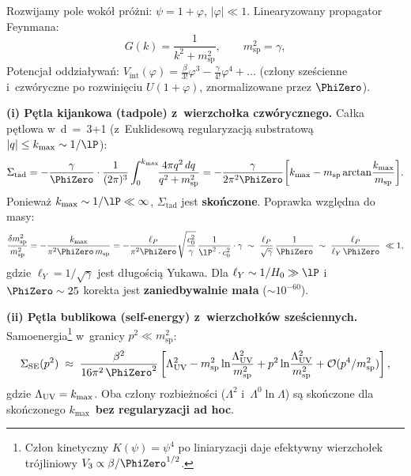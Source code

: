\begin{proposition}\label{prop:one-loop-UV}

Rozwijamy pole wok\'o\l{} pr\'o\.zni: $\psi = 1 + \varphi$,
$|\varphi| \ll 1$. Linearyzowany propagator Feynmana:
\begin{equation}\label{eq:prop-TGP-loops}
  G(k)
  = \frac{1}{k^2 + m_{\mathrm{sp}}^2},
  \qquad m_{\mathrm{sp}}^2 = \gamma,
\end{equation}
Potencja\l{} oddziaływa\'n:
$V_{\mathrm{int}}(\varphi) = \frac{\beta}{3!}\varphi^3
- \frac{\gamma}{4!}\varphi^4 + \ldots$ (cz\l{}ony sze\'scienne i~czw\'oryczne
po rozwini\k{e}ciu $U(1+\varphi)$, znormalizowane przez $\PhiZero$).

\medskip\noindent
\textbf{(i) P\k{e}tla kijankowa (tadpole) z~wierzcho\l{}ka czw\'orycznego.}
Ca\l{}ka p\k{e}tlowa w~d~=~3+1 (z~Euklidesow\k{a} regularyzacj\k{a}
substratow\k{a} $|q| \le k_{\max} \sim 1/\lP$):
\begin{equation}\label{eq:tadpole-TGP}
  \Sigma_{\mathrm{tad}}
  = -\frac{\gamma}{\PhiZero}\cdot
    \frac{1}{(2\pi)^3}\int_0^{k_{\max}}\!\!\frac{4\pi q^2\,dq}{q^2 + m_{\mathrm{sp}}^2}
  = -\frac{\gamma}{2\pi^2\PhiZero}
    \!\left[k_{\max} - m_{\mathrm{sp}}\arctan\!\frac{k_{\max}}{m_{\mathrm{sp}}}\right]\!.
\end{equation}
Poniewa\.z $k_{\max} \sim 1/\lP \ll \infty$,
$\Sigma_{\mathrm{tad}}$ jest \textbf{sko\'nczone}.
Poprawka wzgl\k{e}dna do masy:
\begin{equation}\label{eq:delta-msp}
  \frac{\delta m_{\mathrm{sp}}^2}{m_{\mathrm{sp}}^2}
  = -\frac{k_{\max}}{\pi^2\PhiZero\,m_{\mathrm{sp}}}
  = -\frac{\ell_P}{\pi^2\PhiZero}
    \sqrt{\frac{c_0^2}{\gamma}}\,\frac{1}{\lP^2\cdot c_0^2}\cdot\gamma
  \;\sim\; \frac{\ell_P}{\sqrt{\gamma}}\,\frac{1}{\PhiZero}
  \;\sim\; \frac{\ell_P}{\ell_Y\,\PhiZero}
  \;\ll 1,
\end{equation}
gdzie $\ell_Y = 1/\sqrt{\gamma}$ jest d\l{}ugo\'sci\k{a} Yukawa.
Dla $\ell_Y \sim 1/H_0 \gg \lP$ i~$\PhiZero \sim 25$
korekta jest \textbf{zaniedbywalnie ma\l{}a}
($\sim 10^{-60}$).

\medskip\noindent
\textbf{(ii) P\k{e}tla bublikowa (self-energy) z~wierzcho\l{}k\'ow
  sze\'sciennych.}
Samoenergia\footnote{Cz\l{}on kinetyczny $K(\psi) = \psi^4$
po liniaryzacji daje efektywny wierzcho\l{}ek tr\'ojliniowy
$V_3 \propto \beta/\PhiZero^{1/2}$.}
w~granicy $p^2 \ll m_{\mathrm{sp}}^2$:
\begin{equation}\label{eq:self-energy-TGP}
  \Sigma_{\rm SE}(p^2)
  \;\approx\;
  \frac{\beta^2}{16\pi^2\,\PhiZero^2}
  \left[\Lambda_{\rm UV}^2
       - m_{\mathrm{sp}}^2\ln\!\frac{\Lambda_{\rm UV}^2}{m_{\mathrm{sp}}^2}
       + p^2\ln\!\frac{\Lambda_{\rm UV}^2}{m_{\mathrm{sp}}^2}
       + \mathcal{O}(p^4/m_{\mathrm{sp}}^2)\right],
\end{equation}
gdzie $\Lambda_{\rm UV} = k_{\max}$.
Oba cz\l{}ony rozbie\.zno\'sci ($\Lambda^2$ i~$\Lambda^0\ln\Lambda$)
s\k{a} sko\'nczone dla sko\'nczonego $k_{\max}$~\textbf{bez
regularyzacji ad hoc}.
\end{proposition}

